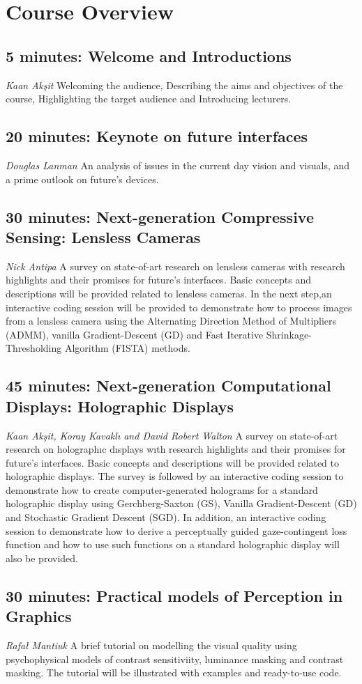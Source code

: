 \chapter*{Course Overview}


\section*{5 minutes: Welcome and Introductions}
\textit{Kaan Akşit}
Welcoming the audience, Describing the aims and objectives of the course, Highlighting the target audience and Introducing lecturers.


\section*{20 minutes: Keynote on future interfaces}
\textit{Douglas Lanman}
An analysis of issues in the current day vision and visuals, and a prime outlook on future's devices.


\section*{30 minutes: Next-generation Compressive Sensing: Lensless Cameras}
\textit{Nick Antipa}
A survey on state-of-art research on lensless cameras with research highlights and their promises for future's interfaces.
Basic concepts and descriptions will be provided related to lensless cameras.
In the next step,an interactive coding session will be provided to demonstrate how to process images from a lensless camera using the Alternating Direction Method of Multipliers (ADMM), vanilla Gradient-Descent (GD) and Fast Iterative Shrinkage-Thresholding Algorithm (FISTA) methods.


\section*{45 minutes: Next-generation Computational Displays: Holographic Displays}
\textit{Kaan Akşit, Koray Kavaklı and David Robert Walton}
A survey on state-of-art research on holographıc dısplays wıth research highlights and their promises for future's interfaces.
Basic concepts and descriptions will be provided related to holographic displays.
The survey is followed by an interactive coding session to demonstrate how to create computer-generated holograms for a standard holographic display using Gerchberg-Saxton (GS), Vanilla Gradient-Descent (GD) and Stochastic Gradient Descent (SGD).
In addition, an interactive coding session to demonstrate how to derive a perceptually guided gaze-contingent loss function and how to use such functions on a standard holographic display will also be provided.


\section*{30 minutes: Practical models of Perception in Graphics}
\textit{Rafał Mantiuk}
A brief tutorial on modelling the visual quality using psychophysical models of contrast sensitiviity, luminance masking and contrast masking.
The tutorial will be illustrated with examples and ready-to-use code.
